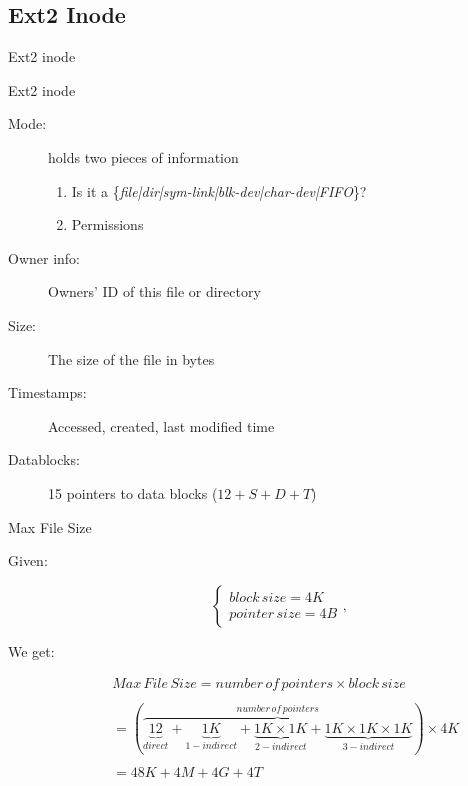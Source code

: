\subsection{Ext2 Inode}

\begin{frame}{Ext2 inode}
  \centering
  \mode<beamer>{ \texttt{[image: osc-11-28]} }
\end{frame}

\begin{frame}
  \begin{block}{Ext2 inode}
    \begin{description}
    \item[Mode:] holds two pieces of information
      \begin{enumerate}
      \item Is it a \mbox{\{\emph{file|dir|sym-link|blk-dev|char-dev|FIFO}\}}?
      \item Permissions
      \end{enumerate}
    \item[Owner info:] Owners' ID of this file or directory
    \item[Size:] The size of the file in bytes
    \item[Timestamps:] Accessed, created, last modified time
    \item[Datablocks:] 15 pointers to data blocks ($12+S+D+T$)
    \end{description}
  \end{block}
\end{frame}

\begin{frame}
  \begin{block}{Max File Size}
    \begin{description}
    \item[Given:]
      \begin{equation*}
        \begin{cases}
          block\,size=4K\\
          pointer\,size=4B
        \end{cases},
      \end{equation*}    
    \item[We get:]
      \begin{equation*}
        \begin{split}
          &Max\,File\,Size
          = number\,of\,pointers\times{}block\,size\\
          &\\
          &= (\overbrace{\underbrace{12}_{direct} + \underbrace{1K}_{1-indirect} +
            \underbrace{1K\times{}1K}_{2-indirect} +
            \underbrace{1K\times{}1K\times{}1K}_{3-indirect}}^{number\,of\,pointers})\times{}4K\\
          &\\
          &= 48K + 4M + 4G + 4T
        \end{split}
      \end{equation*}
    \end{description}
  \end{block}
\end{frame}

